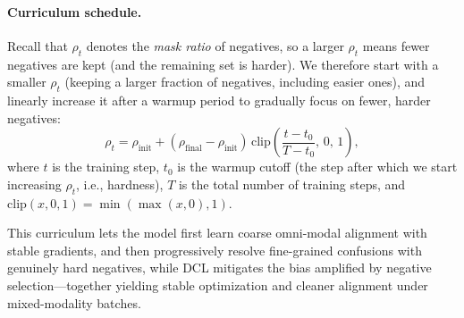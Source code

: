 \paragraph{Curriculum schedule.}
Recall that $\rho_t$ denotes the \emph{mask ratio} of negatives, so a larger $\rho_t$ means fewer negatives are kept (and the remaining set is harder).
We therefore start with a smaller $\rho_t$ (keeping a larger fraction of negatives, including easier ones), and linearly increase it after a warmup period to gradually focus on fewer, harder negatives:
$$
\rho_t=\rho_{\mathrm{init}}+(\rho_{\mathrm{final}}-\rho_{\mathrm{init}})\,
\mathrm{clip}\!\left(\frac{t-t_0}{T-t_0},\,0,\,1\right),
$$
where $t$ is the training step, $t_0$ is the warmup cutoff (the step after which we start increasing $\rho_t$, i.e., hardness), $T$ is the total number of training steps, and $\mathrm{clip}(x,0,1)=\min(\max(x,0),1)$.


This curriculum lets the model first learn coarse omni-modal alignment with stable gradients, and then progressively resolve fine-grained confusions with genuinely hard negatives, while DCL mitigates the bias amplified by negative selection---together yielding stable optimization and cleaner alignment under mixed-modality batches.




